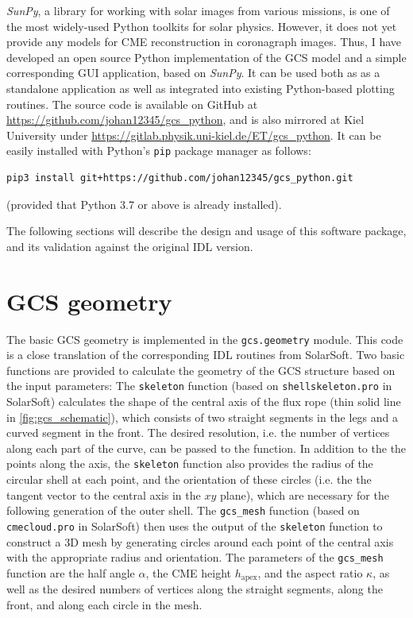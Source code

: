 \textit{SunPy}, a library \citep{sunpy_community2020} for working with solar images from various missions, is one of the most widely-used Python toolkits for solar physics. However, it does not yet provide any models for \ac{CME} reconstruction in coronagraph images.
Thus, I have developed an open source Python implementation of the \ac{GCS} model and a simple corresponding \ac{GUI} application, based on \textit{SunPy}. It can be used both as as a standalone application as well as integrated into existing Python-based plotting routines. The source code is available on GitHub at \url{https://github.com/johan12345/gcs_python}, and is also mirrored at Kiel University under \url{https://gitlab.physik.uni-kiel.de/ET/gcs_python}. It can be easily installed with Python's \texttt{pip} package manager as follows:
\begin{verbatim}
pip3 install git+https://github.com/johan12345/gcs_python.git
\end{verbatim}
(provided that Python 3.7 or above is already installed).

The following sections will describe the design and usage of this software package, and its validation against the original \ac{IDL} version.

\section{GCS geometry}

The basic \ac{GCS} geometry is implemented in the \texttt{gcs.geometry} module. This code is a close translation of the corresponding \ac{IDL} routines from SolarSoft. Two basic functions are provided to calculate the geometry of the \ac{GCS} structure based on the input parameters: The \texttt{skeleton} function (based on \texttt{shellskeleton.pro} in SolarSoft) calculates the shape of the central axis of the flux rope (thin solid line in \autoref{fig:gcs_schematic}), which consists of two straight segments in the legs and a curved segment in the front. The desired resolution, i.e. the number of vertices along each part of the curve, can be passed to the function.
In addition to the the points along the axis, the \texttt{skeleton} function also provides the radius of the circular shell at each point, and the orientation of these circles (i.e. the the tangent vector to the central axis in the $xy$ plane), which are necessary for the following generation of the outer shell.
The \verb|gcs_mesh| function (based on \texttt{cmecloud.pro} in SolarSoft) then uses the output of the \texttt{skeleton} function to construct a 3D mesh by generating circles around each point of the central axis with the appropriate radius and orientation. The parameters of the \verb|gcs_mesh| function are the half angle $\alpha$, the \ac{CME} height $h_\text{apex}$, and the aspect ratio $\kappa$, as well as the desired numbers of vertices along the straight segments, along the front, and along each circle in the mesh.

